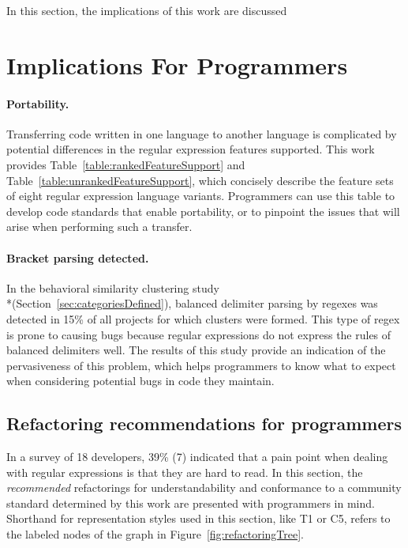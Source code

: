 In this section, the implications of this work are discussed

\section{Implications For Programmers}

\paragraph{Portability.} Transferring code written in one language to another language is complicated by potential differences in the regular expression features supported.  This work provides Table~\ref{table:rankedFeatureSupport} and Table~\ref{table:unrankedFeatureSupport}, which concisely describe the feature sets of eight regular expression language variants.  Programmers can use this table to develop code standards that enable portability, or to pinpoint the issues that will arise when performing such a transfer.

\paragraph{Bracket parsing detected.} In the behavioral similarity clustering study \\*(Section~\ref{sec:categoriesDefined}), balanced delimiter parsing by regexes was detected in 15\% of all projects for which clusters were formed.  This type of regex is prone to causing bugs because regular expressions do not express the rules of balanced delimiters well.  The results of this study provide an indication of the pervasiveness of this problem, which helps programmers to know what to expect when considering potential bugs in code they maintain.

\subsection{Refactoring recommendations for programmers}
In a survey of 18 developers, 39\% (7) indicated that a pain point when dealing with regular expressions is that they are hard to read.  In this section, the \emph{recommended} refactorings for understandability and conformance to a community standard determined by this work are presented with programmers in mind.  Shorthand for representation styles used in this section, like T1 or C5, refers to the labeled nodes of the graph in Figure~\ref{fig:refactoringTree}.

